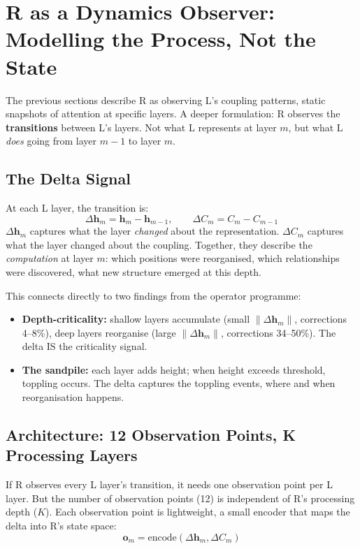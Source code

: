 \documentclass[11pt, a4paper]{article}
\newcommand{\h}{\mathbf{h}}
\theoremstyle{plain}
\theoremstyle{definition}
\theoremstyle{remark}
\begin{document}
\section{R as a Dynamics Observer: Modelling the Process, Not the State}
\label{app:dynamics}

The previous sections describe R as observing L's coupling patterns, static snapshots of attention at specific layers.
A deeper formulation: R observes the \textbf{transitions} between L's layers.
Not what L represents at layer $m$, but what L \emph{does} going from layer $m{-}1$ to layer $m$.

\subsection{The Delta Signal}

At each L layer, the transition is:
\begin{equation}
\Delta \h_m = \h_m - \h_{m-1}, \qquad \Delta C_m = C_m - C_{m-1}
\end{equation}
$\Delta \h_m$ captures what the layer \emph{changed} about the representation.
$\Delta C_m$ captures what the layer changed about the coupling.
Together, they describe the \emph{computation} at layer $m$: which positions were reorganised, which relationships were discovered, what new structure emerged at this depth.

This connects directly to two findings from the operator programme:
\begin{itemize}[nosep]
\item \textbf{Depth-criticality:} shallow layers accumulate (small $\|\Delta\h_m\|$, corrections 4--8\%), deep layers reorganise (large $\|\Delta\h_m\|$, corrections 34--50\%). The delta IS the criticality signal.
\item \textbf{The sandpile:} each layer adds height; when height exceeds threshold, toppling occurs. The delta captures the toppling events, where and when reorganisation happens.
\end{itemize}

\subsection{Architecture: 12 Observation Points, K Processing Layers}

If R observes every L layer's transition, it needs one observation point per L layer.
But the number of observation points (12) is independent of R's processing depth ($K$).
Each observation point is lightweight, a small encoder that maps the delta into R's state space:
\begin{equation}
\mathbf{o}_m = \mathrm{encode}(\Delta\h_m, \Delta C_m)
\end{equation}
\end{document}
